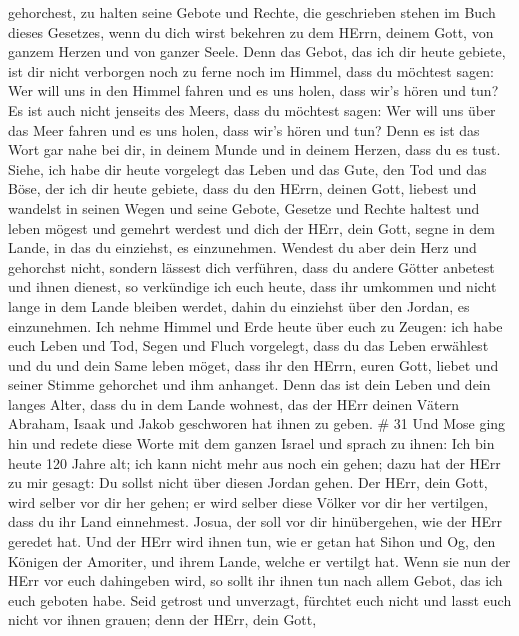 gehorchest, zu halten seine Gebote und Rechte, die geschrieben stehen im
Buch dieses Gesetzes, wenn du dich wirst bekehren zu dem HErrn, deinem
Gott, von ganzem Herzen und von ganzer Seele.  Denn das
Gebot, das ich dir heute gebiete, ist dir nicht verborgen noch zu ferne
 noch im Himmel, dass du möchtest sagen: Wer will uns in
den Himmel fahren und es uns holen, dass wir's hören und tun?
 Es ist auch nicht jenseits des Meers, dass du möchtest
sagen: Wer will uns über das Meer fahren und es uns holen, dass wir's
hören und tun?  Denn es ist das Wort gar nahe bei dir, in
deinem Munde und in deinem Herzen, dass du es tust.  Siehe,
ich habe dir heute vorgelegt das Leben und das Gute, den Tod und das
Böse,  der ich dir heute gebiete, dass du den HErrn, deinen
Gott, liebest und wandelst in seinen Wegen und seine Gebote, Gesetze und
Rechte haltest und leben mögest und gemehrt werdest und dich der HErr,
dein Gott, segne in dem Lande, in das du einziehst, es einzunehmen.
 Wendest du aber dein Herz und gehorchst nicht, sondern
lässest dich verführen, dass du andere Götter anbetest und ihnen
dienest,  so verkündige ich euch heute, dass ihr umkommen
und nicht lange in dem Lande bleiben werdet, dahin du einziehst über den
Jordan, es einzunehmen.  Ich nehme Himmel und Erde heute
über euch zu Zeugen: ich habe euch Leben und Tod, Segen und Fluch
vorgelegt, dass du das Leben erwählest und du und dein Same leben möget,
 dass ihr den HErrn, euren Gott, liebet und seiner Stimme
gehorchet und ihm anhanget. Denn das ist dein Leben und dein langes
Alter, dass du in dem Lande wohnest, das der HErr deinen Vätern Abraham,
Isaak und Jakob geschworen hat ihnen zu geben. \# 31  Und
Mose ging hin und redete diese Worte mit dem ganzen Israel 
und sprach zu ihnen: Ich bin heute 120 Jahre alt; ich kann nicht mehr
aus noch ein gehen; dazu hat der HErr zu mir gesagt: Du sollst nicht
über diesen Jordan gehen.  Der HErr, dein Gott, wird selber
vor dir her gehen; er wird selber diese Völker vor dir her vertilgen,
dass du ihr Land einnehmest. Josua, der soll vor dir hinübergehen, wie
der HErr geredet hat.  Und der HErr wird ihnen tun, wie er
getan hat Sihon und Og, den Königen der Amoriter, und ihrem Lande,
welche er vertilgt hat.  Wenn sie nun der HErr vor euch
dahingeben wird, so sollt ihr ihnen tun nach allem Gebot, das ich euch
geboten habe.  Seid getrost und unverzagt, fürchtet euch
nicht und lasst euch nicht vor ihnen grauen; denn der HErr, dein Gott,
